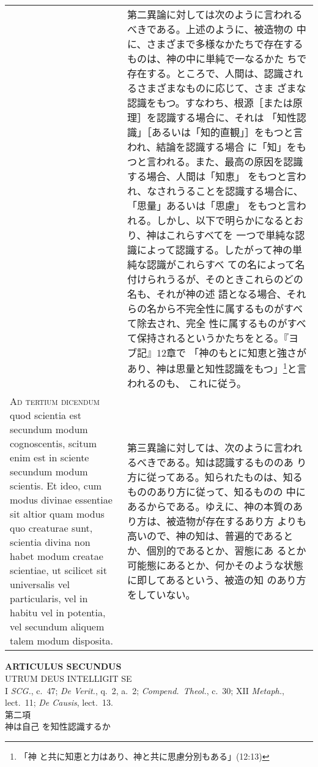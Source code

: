 \documentclass[10pt]{jsarticle} %
\begin{document}
\begin{longtable}{p{21em}p{21em}}
&

第二異論に対しては次のように言われるべきである。上述のように、被造物の
中に、さまざまで多様なかたちで存在するものは、神の中に単純で一なるかた
ちで存在する。ところで、人間は、認識されるさまざまなものに応じて、さま
ざまな認識をもつ。すなわち、根源［または原理］を認識する場合に、それは
「知性認識」［あるいは「知的直観」］をもつと言われ、結論を認識する場合
に「知」をもつと言われる。また、最高の原因を認識する場合、人間は「知恵」
をもつと言われ、なされうることを認識する場合に、「思量」あるいは「思慮」
をもつと言われる。しかし、以下で明らかになるとおり、神はこれらすべてを
一つで単純な認識によって認識する。したがって神の単純な認識がこれらすべ
ての名によって名付けられうるが、そのときこれらのどの名も、それが神の述
語となる場合、それらの名から不完全性に属するものがすべて除去され、完全
性に属するものがすべて保持されるというかたちをとる。『ヨブ記』12章で
「神のもとに知恵と強さがあり、神は思量と知性認識をもつ」\footnote{「神
と共に知恵と力はあり、神と共に思慮分別もある」(12:13)}と言われるのも、
これに従う。

\\



{\scshape Ad tertium dicendum} quod scientia est secundum modum
cognoscentis, scitum enim est in sciente secundum modum scientis. Et
ideo, cum modus divinae essentiae sit altior quam modus quo creaturae
sunt, scientia divina non habet modum creatae scientiae, ut scilicet
sit universalis vel particularis, vel in habitu vel in potentia, vel
secundum aliquem talem modum disposita.

&

第三異論に対しては、次のように言われるべきである。知は認識するもののあ
り方に従ってある。知られたものは、知るもののあり方に従って、知るものの
中にあるからである。ゆえに、神の本質のあり方は、被造物が存在するあり方
よりも高いので、神の知は、普遍的であるとか、個別的であるとか、習態にあ
るとか可能態にあるとか、何かそのような状態に即してあるという、被造の知
のあり方をしていない。



\end{longtable}
\newpage

\begin{center}
{\Large {\bf ARTICULUS SECUNDUS}}\\ {\large UTRUM DEUS INTELLIGIT
SE}\\ {\footnotesize I {\itshape SCG.}, c.~47; {\itshape De Verit.},
q.~2, a.~2; {\itshape Compend.~Theol.}, c.~30; XII {\itshape Metaph.},
lect.~11; {\itshape De Causis}, lect.~13.}\\ {\Large 第二項\\神は自己
を知性認識するか}
\end{center}
\end{document}
